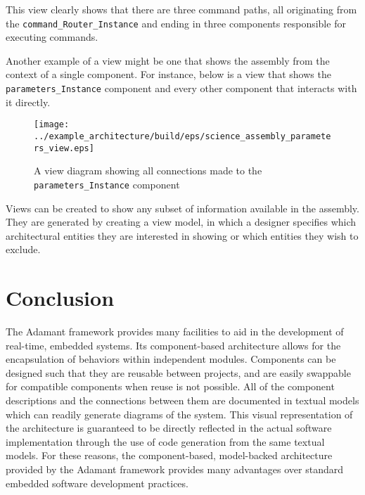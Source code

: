 This view clearly shows that there are three command paths, all originating from the \texttt{command\_Router\_Instance} and ending in three components responsible for executing commands.

Another example of a view might be one that shows the assembly from the context of a single component. For instance, below is a view that shows the \texttt{parameters\_Instance} component and every other component that interacts with it directly.

\begin{figure}[H]
  \texttt{[image: ../example\_architecture/build/eps/science\_assembly\_parameters\_view.eps]}
  \caption{A view diagram showing all connections made to the \texttt{parameters\_Instance} component}
\end{figure}

Views can be created to show any subset of information available in the assembly. They are generated by creating a view model, in which a designer specifies which architectural entities they are interested in showing or which entities they wish to exclude.

\section{Conclusion}

The Adamant framework provides many facilities to aid in the development of real-time, embedded systems. Its component-based architecture allows for the encapsulation of behaviors within independent modules. Components can be designed such that they are reusable between projects, and are easily swappable for compatible components when reuse is not possible. All of the component descriptions and the connections between them are documented in textual models which can readily generate diagrams of the system. This visual representation of the architecture is guaranteed to be directly reflected in the actual software implementation through the use of code generation from the same textual models. For these reasons, the component-based, model-backed architecture provided by the Adamant framework provides many advantages over standard embedded software development practices.


